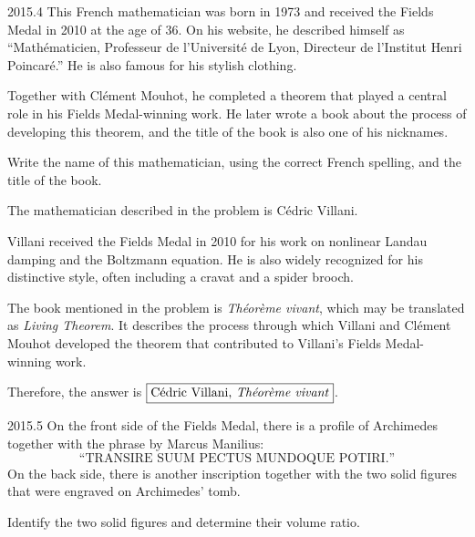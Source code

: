     \begin{pastproblem}{2015.4}
        This French mathematician was born in 1973 and received the Fields Medal in 2010 at the age
        of $36$. On his website, he described himself as ``Math\'ematicien, Professeur de
        l'Universit\'e de Lyon, Directeur de l'Institut Henri Poincar\'e.'' He is also famous for
        his stylish clothing.

        Together with Cl\'ement Mouhot, he completed a theorem that played a central role in his
        Fields Medal-winning work. He later wrote a book about the process of developing this
        theorem, and the title of the book is also one of his nicknames.

        Write the name of this mathematician, using the correct French spelling, and the title of
        the book.
    \end{pastproblem}

    \begin{solution}
        The mathematician described in the problem is C\'edric Villani.

        Villani received the Fields Medal in 2010 for his work on nonlinear Landau damping and the
        Boltzmann equation. He is also widely recognized for his distinctive style, often including
        a cravat and a spider brooch.

        The book mentioned in the problem is \textit{Th\'eor\`eme vivant}, which may be translated
        as \textit{Living Theorem}. It describes the process through which Villani and Cl\'ement
        Mouhot developed the theorem that contributed to Villani's Fields Medal-winning work.

        Therefore, the answer is $\boxed{\text{C\'edric Villani, \textit{Th\'eor\`eme vivant}}}$.
    \end{solution}

    \begin{pastproblem}{2015.5}
        On the front side of the Fields Medal, there is a profile of Archimedes together with the
        phrase by Marcus Manilius:
        \[
            \text{``TRANSIRE SUUM PECTUS MUNDOQUE POTIRI.''}
        \]
        On the back side, there is another inscription together with the two solid figures that were
        engraved on Archimedes' tomb.

        Identify the two solid figures and determine their volume ratio.
    \end{pastproblem}

